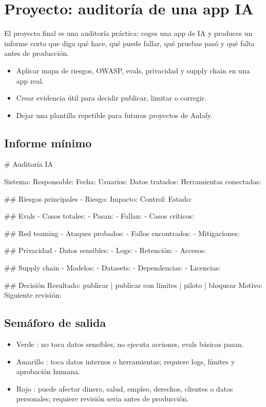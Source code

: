 \documentclass[11pt,a4paper]{book}
\begin{document}
\chapter{Proyecto: auditoría de una app IA}
El proyecto final es una auditoría práctica: coges una app de IA y produces un informe corto que diga qué hace, qué puede fallar, qué pruebas pasó y qué falta antes de producción.

\begin{itemize}\item Aplicar mapa de riesgos, OWASP, evals, privacidad y supply chain en una app real.\end{itemize}
\begin{itemize}\item Crear evidencia útil para decidir publicar, limitar o corregir.\end{itemize}
\begin{itemize}\item Dejar una plantilla repetible para futuros proyectos de Aulafy.\end{itemize}
\section{Informe mínimo}
\begin{codebox}
# Auditoría IA

Sistema:
Responsable:
Fecha:
Usuarios:
Datos tratados:
Herramientas conectadas:

## Riesgos principales
- Riesgo:
  Impacto:
  Control:
  Estado:

## Evals
- Casos totales:
- Pasan:
- Fallan:
- Casos críticos:

## Red teaming
- Ataques probados:
- Fallos encontrados:
- Mitigaciones:

## Privacidad
- Datos sensibles:
- Logs:
- Retención:
- Accesos:

## Supply chain
- Modelos:
- Datasets:
- Dependencias:
- Licencias:

## Decisión
Resultado: publicar | publicar con límites | piloto | bloquear
Motivo:
Siguiente revisión:
\end{codebox}
\section{Semáforo de salida}
\begin{itemize}\item Verde : no toca datos sensibles, no ejecuta acciones, evals básicas pasan.\end{itemize}
\begin{itemize}\item Amarillo : toca datos internos o herramientas; requiere logs, límites y aprobación humana.\end{itemize}
\begin{itemize}\item Rojo : puede afectar dinero, salud, empleo, derechos, clientes o datos personales; requiere revisión seria antes de producción.\end{itemize}
\end{document}

